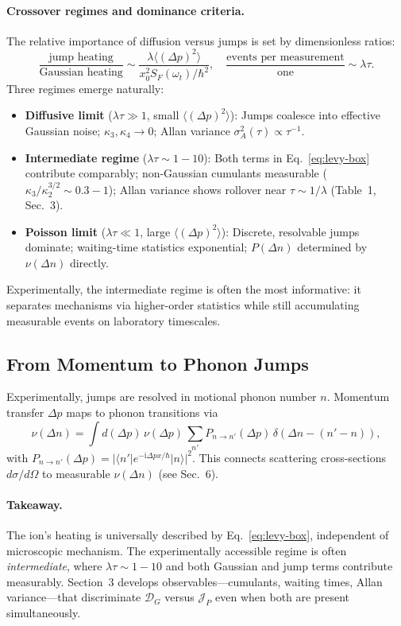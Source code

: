 \paragraph{Crossover regimes and dominance criteria.}
The relative importance of diffusion versus jumps is set by dimensionless ratios:
\begin{equation}
\frac{\text{jump heating}}{\text{Gaussian heating}} 
\sim \frac{\lambda \langle (\Delta p)^2 \rangle}{x_0^2 S_F(\omega_t)/\hbar^2},
\quad
\frac{\text{events per measurement}}{\text{one}} 
\sim \lambda \tau.
\end{equation}
Three regimes emerge naturally:
\begin{itemize}
\item \textbf{Diffusive limit} ($\lambda \tau \gg 1$, small $\langle(\Delta p)^2\rangle$): 
  Jumps coalesce into effective Gaussian noise; 
  $\kappa_3, \kappa_4 \to 0$; 
  Allan variance $\sigma_A^2(\tau) \propto \tau^{-1}$.
\item \textbf{Intermediate regime} ($\lambda \tau \sim 1{-}10$): 
  Both terms in Eq.~\eqref{eq:levy-box} contribute comparably; 
  non-Gaussian cumulants measurable ($\kappa_3/\kappa_2^{3/2} \sim 0.3{-}1$); 
  Allan variance shows rollover near $\tau \sim 1/\lambda$ 
  (Table~1, Sec.~3).
\item \textbf{Poisson limit} ($\lambda \tau \ll 1$, large $\langle(\Delta p)^2\rangle$): 
  Discrete, resolvable jumps dominate; 
  waiting-time statistics exponential; 
  $P(\Delta n)$ determined by $\nu(\Delta n)$ directly.
\end{itemize}
Experimentally, the intermediate regime is often the most informative: 
it separates mechanisms via higher-order statistics while still accumulating 
measurable events on laboratory timescales.

\subsection{From Momentum to Phonon Jumps}
Experimentally, jumps are resolved in motional phonon number $n$. 
Momentum transfer $\Delta p$ maps to phonon transitions via
\begin{equation}
\nu(\Delta n) = \int d(\Delta p)\,\nu(\Delta p)\,\sum_{n'} P_{n\to n'}(\Delta p)\, \delta(\Delta n-(n'-n)),
\end{equation}
with $P_{n\to n'}(\Delta p)=|\langle n'|e^{-\mathrm{i}\Delta p x/\hbar}|n\rangle|^2$. 
This connects scattering cross-sections $d\sigma/d\Omega$ to measurable $\nu(\Delta n)$ (see Sec.~6).

\paragraph{Takeaway.} 
The ion's heating is universally described by Eq.~\eqref{eq:levy-box}, independent of microscopic mechanism. 
The experimentally accessible regime is often \emph{intermediate}, where $\lambda \tau \sim 1{-}10$ and both Gaussian and jump terms contribute measurably. 
Section~3 develops observables—cumulants, waiting times, Allan variance—that discriminate $\mathcal{D}_G$ versus $\mathcal{J}_P$ even when both are present simultaneously.

